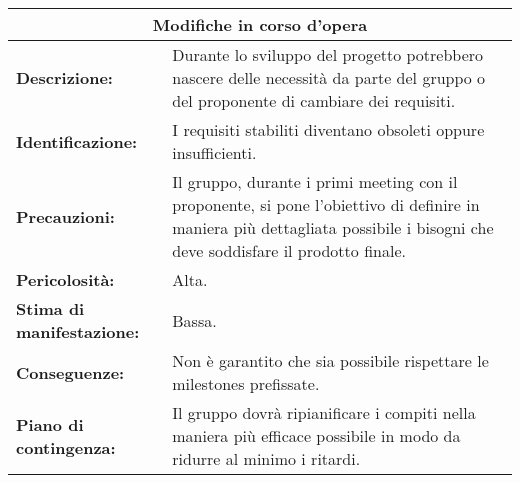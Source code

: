 \begin{tabularx}{\textwidth}{|X|X|}
\hline
\multicolumn{2}{|c|}{\textbf{Modifiche in corso d'opera}} \\
\hline
\textbf{Descrizione:}& Durante lo sviluppo del progetto potrebbero nascere delle necessità da parte del gruppo o del proponente di cambiare dei requisiti.\\
\hline
\textbf{Identificazione:}& I requisiti stabiliti diventano obsoleti oppure insufficienti. \\
\hline
\textbf{Precauzioni:}& Il gruppo, durante i primi meeting con il proponente, si pone l'obiettivo di definire in maniera più dettagliata possibile i bisogni che deve soddisfare il prodotto finale.\\
\hline
\textbf{Pericolosità:}& Alta.\\
\hline
\textbf{Stima di manifestazione:}& Bassa.\\
\hline
\textbf{Conseguenze:}& Non è garantito che sia possibile rispettare le milestones prefissate.\\
\hline
\textbf{Piano di contingenza:}& Il gruppo dovrà ripianificare i compiti nella maniera più efficace possibile in modo da ridurre al minimo i ritardi. \\
\hline
\end{tabularx}



